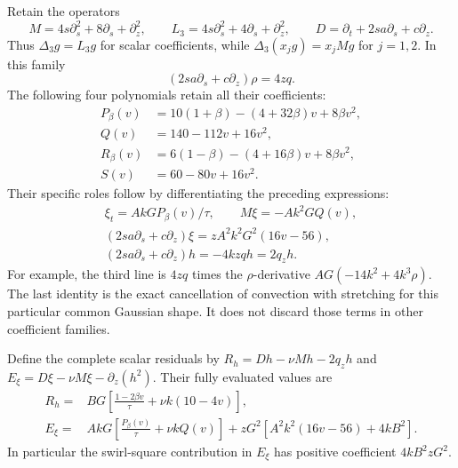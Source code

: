 Retain the operators
\[
 M=4s\partial_s^2+8\partial_s+\partial_z^2,
 \qquad L_3=4s\partial_s^2+4\partial_s+\partial_z^2,
 \qquad D=\partial_t+2s a\partial_s+c\partial_z.
\]
Thus \(\Delta_3g=L_3g\) for scalar coefficients, while
\(\Delta_3(x_jg)=x_jMg\) for \(j=1,2\).  In this family
\[
 (2s a\partial_s+c\partial_z)\rho=4zq.
\]
The following four polynomials retain all their coefficients:
\begin{equation}\label{eq:ag-polynomials}
 \begin{split}
 P_\beta(v)&=10(1+\beta)-(4+32\beta)v+8\beta v^2,\\
 Q(v)&=140-112v+16v^2,\\
 R_\beta(v)&=6(1-\beta)-(4+16\beta)v+8\beta v^2,\\
 S(v)&=60-80v+16v^2.
 \end{split}
\end{equation}
Their specific roles follow by differentiating the preceding expressions:
\begin{equation}\label{eq:ag-residual-derivatives}
 \begin{gathered}
 \xi_t=A kG P_\beta(v)/\tau,\qquad M\xi=-A k^2GQ(v),\\
 (2s a\partial_s+c\partial_z)\xi
   =zA^2k^2G^2(16v-56),\\
 (2s a\partial_s+c\partial_z)h=-4kzqh=2q_z h.
 \end{gathered}
\end{equation}
For example, the third line is \(4zq\) times the \(\rho\)-derivative
\(A G(-14k^2+4k^3\rho)\).  The last identity is the exact cancellation
of convection with stretching for this particular common Gaussian shape.
It does not discard those terms in other coefficient families.

Define the complete scalar residuals by
\(R_h=Dh-\nu Mh-2q_zh\) and
\(E_\xi=D\xi-\nu M\xi-\partial_z(h^2)\).  Their fully evaluated
values are
\begin{equation}\label{eq:ag-residuals}
 \begin{split}
 R_h={}& B G\left[\frac{1-2\beta v}{\tau}+\nu k(10-4v)\right],\\
 E_\xi={}&A kG\left[\frac{P_\beta(v)}{\tau}+\nu kQ(v)\right]
       +zG^2\left[A^2k^2(16v-56)+4kB^2\right].
 \end{split}
\end{equation}
In particular the swirl-square contribution in \(E_\xi\) has positive
coefficient \(4kB^2zG^2\).

